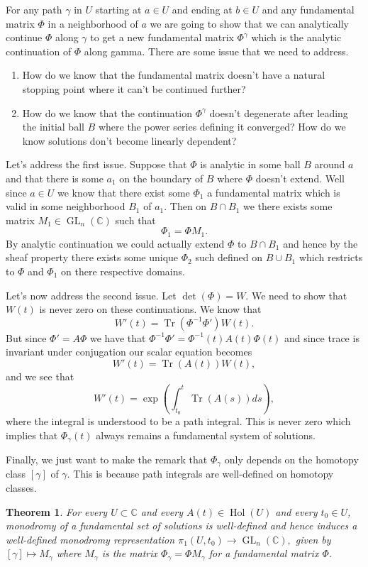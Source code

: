 \documentclass[]{book}
\numberwithin{equation}{section}
\newtheorem{theorem}{Theorem}[subsection]
\theoremstyle{definition}
\theoremstyle{remark}
\newcommand{\CC}{\mathbb{C}}
\newcommand{\hol}{\operatorname{Hol}}
\newcommand{\GL}{\operatorname{GL}}
\newcommand{\Tr}{\operatorname{Tr}}
\begin{document}
For any path $\gamma$ in $U$ starting at $a \in U$ and ending at $b\in U$ and any fundamental matrix $\Phi$ in a neighborhood of $a$ we are going to show that we can analytically continue $\Phi$ along $\gamma$ to get a new fundamental matrix $\Phi^{\gamma}$ which is the analytic continuation of $\Phi$ along gamma.
There are some issue that we need to address.
\begin{enumerate}
\item How do we know that the fundamental matrix doesn't have a natural stopping point where it can't be continued further?
\item How do we know that the continuation $\Phi^{\gamma}$ doesn't degenerate after leading the initial ball $B$ where the power series defining it converged? How do we know solutions don't become linearly dependent?
\end{enumerate}

Let's address the first issue. 
Suppose that $\Phi$ is analytic in some ball $B$ around $a$ and that there is some $a_1$ on the boundary of $B$ where $\Phi$ doesn't extend. 
Well since $a \in U$ we know that there exist some $\Phi_1$ a fundamental matrix which is valid in some neighborhood $B_1$ of $a_1$. 
Then on $B\cap B_1$ we there exists some matrix $M_1 \in \GL_n(\CC)$ such that 
 $$ \Phi_1 = \Phi M_1.$$
By analytic continuation we could actually extend $\Phi$ to $B\cap B_1$ and hence by the sheaf property there exists some unique $\Phi_2$ such defined on $B \cup B_1$ which restricts to $\Phi$ and $\Phi_1$ on there respective domains.

Let's now address the second issue. 
Let $\det(\Phi)=W$. 
We need to show that $W(t)$ is never zero on these continuations. 
We know that 
 $$ W'(t) = \Tr( \Phi^{-1} \Phi') W(t). $$
But since $\Phi' = A\Phi$ we have that $\Phi^{-1} \Phi' = \Phi^{-1}(t) A(t) \Phi(t)$ and since trace is invariant under conjugation our scalar equation becomes 
 $$ W'(t) = \Tr(A(t)) W(t), $$
and we see that 
 $$ W'(t) = \exp(\int_{t_0}^t \Tr(A(s)) ds),$$
where the integral is understood to be a path integral. 
This is never zero which implies that $\Phi_{\gamma}(t)$ always remains a fundamental system of solutions.

Finally, we just want to make the remark that $\Phi_{\gamma}$ only depends on the homotopy class $[\gamma]$ of $\gamma$. 
This is because path integrals are well-defined on homotopy classes.  



\begin{theorem}
For every $U \subset \CC$ and every $A(t) \in \hol(U)$ and every $t_0 \in U$, monodromy of a fundamental set of solutions is well-defined and hence induces a well-defined monodromy representation $ \pi_1(U,t_0) \to \GL_n(\CC),$ given by $[\gamma] \mapsto M_{\gamma}$ where $M_{\gamma}$ is the matrix  $\Phi_{\gamma}=\Phi M_{\gamma}$ for a fundamental matrix $\Phi$.
\end{theorem}
\end{document}
